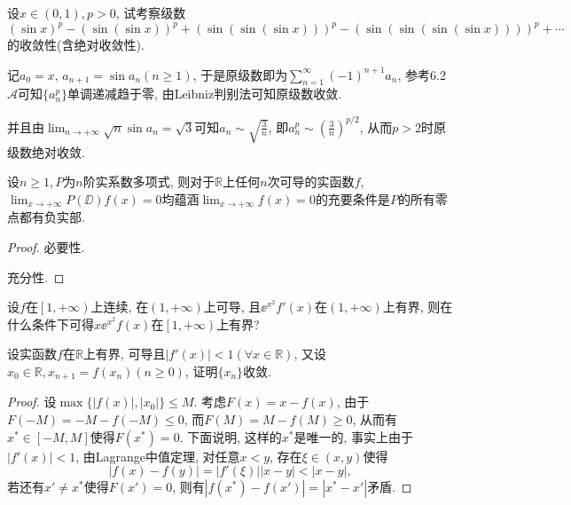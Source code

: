 \begin{quizb}
\woe 设\(x\in(0,1),p>0\), 试考察级数\[\left(\sin x\right)^p-\left(\sin\left(\sin x\right)\right)^p+\left(\sin\left(\sin\left(\sin x\right)\right)\right)^p-\left(\sin\left(\sin\left(\sin\left(\sin x\right)\right)\right)\right)^p+\cdots\]的收敛性(含绝对收敛性).
\begin{solution}
记\(a_0=x\), \(a_{n+1}=\sin a_n(n\geqslant 1)\), 于是原级数即为\(\sum_{n=1}^{\infty}(-1)^{n+1}a_n\), 参考6.2\(\boldsymbol{\mathcal{A}}\)可知\(\{a_n^p\}\)单调递减趋于零, 由Leibniz判别法可知原级数收敛. 

并且由\(\lim_{n\rightarrow+\infty}\sqrt{n}\sin a_n=\sqrt{3}\)可知\(a_n\sim\sqrt{\frac{3}{n}}\), 即\(a_n^p\sim\left(\frac{3}{n}\right)^{p/2}\), 从而\(p>2\)时原级数绝对收敛.
\end{solution}
\woe 设\(n\geqslant 1,P\)为\(n\)阶实系数多项式, 则对于\(\mathbb{R}\)上任何\(n\)次可导的实函数\(f\), \(\lim_{x\rightarrow +\infty}P(\DD)f(x)=0\)均蕴涵\(\lim_{x\rightarrow+\infty}f(x)=0\)的充要条件是\(P\)的所有零点都有负实部.
\begin{proof}
	必要性.
    
    充分性.
\end{proof}
\woe 设\(f\)在\(\left[1,+\infty\right)\)上连续, 在\(\left(1,+\infty\right)\)上可导, 且\(\ee^{x^2}f'(x)\)在\(\left(1,+\infty\right)\)上有界, 则在什么条件下可得\(x\ee^{x^2}f(x)\)在\(\left[1,+\infty\right)\)上有界?
\begin{solution}
	
\end{solution}
\woe 设实函数\(f\)在\(\mathbb{R}\)上有界, 可导且\(|f'(x)|<1(\forall x\in\mathbb{R})\), 又设\(x_0\in\mathbb{R},x_{n+1}=f(x_n)(n\geqslant 0)\), 证明\(\{x_n\}\)收敛.
\begin{proof}
设\(\max\{\left|f(x)\right|,|x_0|\}\leqslant M\). 考虑\(F(x)=x-f(x)\), 由于\(F(-M)=-M-f(-M)\leqslant 0\), 而\(F(M)=M-f(M)\geqslant 0\), 从而有\(x^*\in[-M,M]\)使得\(F(x^*)=0\). 下面说明, 这样的\(x^*\)是唯一的, 事实上由于\(|f'(x)|<1\), 由Lagrange中值定理, 对任意\(x<y\), 存在\(\xi\in(x,y)\)使得\[\left|f(x)-f(y)\right|=|f'(\xi)||x-y|<|x-y|,\]若还有\(x'\ne x^*\)使得\(F(x')=0\), 则有\(\left|f(x^*)-f(x')\right|=|x^*-x'|\)矛盾.


\end{proof}
\end{quizb}
